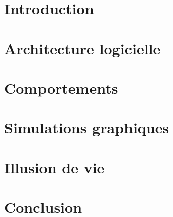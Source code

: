 \documentclass[a4paper,12pt]{article}
\begin{document}

\clearpage
\tableofcontents
\clearpage

\section*{Introduction}


\section{Architecture logicielle}


\section{Comportements}


\section{Simulations graphiques}


\section{Illusion de vie}


\section*{Conclusion}

\end{document}

